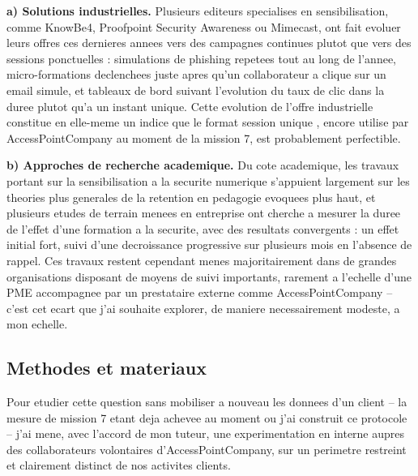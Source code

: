 \documentclass[11pt,a4paper]{article}
\begin{document}
\textbf{a) Solutions industrielles.} Plusieurs editeurs specialises en sensibilisation, comme KnowBe4, Proofpoint Security Awareness ou Mimecast, ont fait evoluer leurs offres ces dernieres annees vers des campagnes continues plutot que vers des sessions ponctuelles : simulations de phishing repetees tout au long de l'annee, micro-formations declenchees juste apres qu'un collaborateur a clique sur un email simule, et tableaux de bord suivant l'evolution du taux de clic dans la duree plutot qu'a un instant unique. Cette evolution de l'offre industrielle constitue en elle-meme un indice que le format \guillemotleft session unique \guillemotright, encore utilise par AccessPointCompany au moment de la mission 7, est probablement perfectible.

\textbf{b) Approches de recherche academique.} Du cote academique, les travaux portant sur la sensibilisation a la securite numerique s'appuient largement sur les theories plus generales de la retention en pedagogie evoquees plus haut, et plusieurs etudes de terrain menees en entreprise ont cherche a mesurer la duree de l'effet d'une formation a la securite, avec des resultats convergents : un effet initial fort, suivi d'une decroissance progressive sur plusieurs mois en l'absence de rappel. Ces travaux restent cependant menes majoritairement dans de grandes organisations disposant de moyens de suivi importants, rarement a l'echelle d'une PME accompagnee par un prestataire externe comme AccessPointCompany -- c'est cet ecart que j'ai souhaite explorer, de maniere necessairement modeste, a mon echelle.

\subsection{Methodes et materiaux}

Pour etudier cette question sans mobiliser a nouveau les donnees d'un client -- la mesure de mission 7 etant deja achevee au moment ou j'ai construit ce protocole -- j'ai mene, avec l'accord de mon tuteur, une experimentation en interne aupres des collaborateurs volontaires d'AccessPointCompany, sur un perimetre restreint et clairement distinct de nos activites clients.
\end{document}
